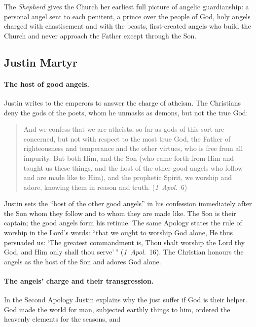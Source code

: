 The \emph{Shepherd} gives the Church her earliest full picture of angelic
guardianship: a personal angel sent to each penitent, a prince over the
people of God, holy angels charged with chastisement and with the beasts,
first-created angels who build the Church and never approach the Father
except through the Son.

\sectionguard
\subsection{Justin Martyr}

\paragraph{The host of good angels.} Justin writes to the emperors to answer
the charge of atheism. The Christians deny the gods of the poets, whom he
unmasks as demons, but not the true God:

\begin{quote}
And we confess that we are atheists, so far as gods of this sort are
concerned, but not with respect to the most true God, the Father of
righteousness and temperance and the other virtues, who is free from all
impurity. But both Him, and the Son (who came forth from Him and taught
us these things, and the host of the other good angels who follow and are
made like to Him), and the prophetic Spirit, we worship and adore,
knowing them in reason and truth. (\emph{1~Apol.}\ 6)
\end{quote}

\noindent Justin sets the ``host of the other good angels'' in his
confession immediately after the Son whom they follow and to whom they are
made like. The Son is their captain; the good angels form his retinue.
The same Apology states the rule of worship in the Lord's words: ``that we
ought to worship God alone, He thus persuaded us: `The greatest
commandment is, Thou shalt worship the Lord thy God, and Him only shall
thou serve'\,'' (\emph{1~Apol.}\ 16). The Christian honours the angels as
the host of the Son and adores God alone.

\paragraph{The angels' charge and their transgression.} In the Second
Apology Justin explains why the just suffer if God is their helper. God
made the world for man, subjected earthly things to him, ordered the
heavenly elements for the seasons, and

